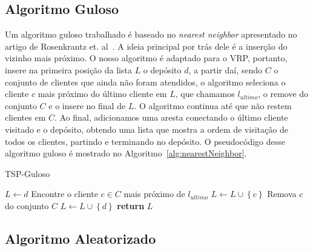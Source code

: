 \documentclass[12pt, a4paper]{article}
\begin{document}
\subsection{Algoritmo Guloso}\label{subsec:algguloso}

Um algoritmo guloso trabalhado é baseado no \textit{nearest neighbor} apresentado no artigo de Rosenkrantz et. al~\cite{rosenkrantz1977analysis}. A ideia principal por trás dele é a inserção do vizinho mais próximo. O nosso algoritmo é adaptado para o VRP, portanto, insere na primeira posição da lista $L$ o depósito $d$, a partir daí, sendo $C$ o conjunto de clientes que ainda não foram atendidos, o algoritmo seleciona o cliente $c$ mais próximo do último cliente em $L$, que chamamos $l_{ultimo}$, o remove do conjunto $C$ e o insere no final de $L$. O algoritmo continua até que não restem clientes em $C$. Ao final, adicionamos uma aresta conectando o último cliente visitado e o depósito, obtendo uma lista que mostra a ordem de visitação de todos os clientes, partindo e terminando no depósito. O pseudocódigo desse algoritmo guloso é mostrado no Algoritmo~\ref{alg:nearestNeighbor}.\par 
%
\begin{algorithm}[htb!]
  \caption{TSP-Guloso}\label{alg:nearestNeighbor}
  \begin{algorithmic}[1]
      \State $L \gets d$
        \State Encontre o cliente $c \in C$ mais próximo de $l_{ultimo}$
        \State $L\gets L \cup \left\{c\right\}$
        \State Remova $c$ do conjunto $C$
       \EndWhile
      \State $L \gets L \cup \left\{ d \right\}$ 
      \State \textbf{return} $L$
    \EndFunction
  \end{algorithmic}
\end{algorithm}


\subsection{Algoritmo Aleatorizado}
\end{document}
